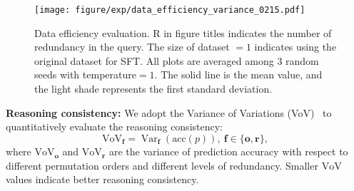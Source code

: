 
\begin{figure}[t]
    \centering
    \texttt{[image: figure/exp/data\_efficiency\_variance\_0215.pdf]}
    \caption{Data efficiency evaluation. R in figure titles indicates the number of redundancy in the query. The size of dataset $=1$ indicates using the original dataset for SFT. All plots are averaged among $3$
random seeds with temperature$=1$. The solid line is the mean value, and the light shade represents the first standard deviation.}
    \label{fig: data efficiency}
    \vspace{-2mm}
\end{figure}




\textbf{Reasoning consistency:} We adopt the Variance of Variations (VoV)~\citep{zhou2024paraphrase} to quantitatively evaluate the reasoning consistency:  
\begin{equation}
\mathrm{VoV}_{\mathbf{f}}=\operatorname{Var}_{\mathbf{f}}(\mathrm{acc}(p)),\ {\mathbf{f}} \in \{\mathbf{o}, \mathbf{r}\},
\end{equation}
where $\mathrm{VoV}_\mathbf{o}$ and $\mathrm{VoV}_\mathbf{r}$ are the variance of prediction accuracy with respect to different permutation orders and different levels of redundancy. Smaller $\mathrm{VoV}$ values indicate better reasoning consistency. 

